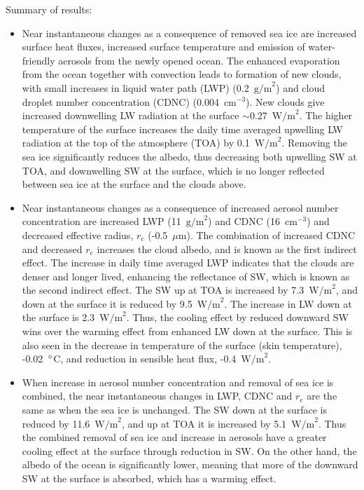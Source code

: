 Summary of results:
\begin{itemize}
\item Near instantaneous changes as a consequence of removed sea ice are increased surface heat fluxes, increased surface temperature and emission of water-friendly aerosols from the newly opened ocean. The enhanced evaporation from the ocean together with convection leads to formation of new clouds, with small increases in liquid water path (LWP) (0.2~$\text{g/m}^2$) and cloud droplet number concentration (CDNC) (0.004~$\text{cm}^{-3}$). New clouds give increased downwelling LW radiation at the surface $\sim$0.27~$\text{W/m}^2$. The higher temperature of the surface increases the daily time averaged upwelling LW radiation at the top of the atmosphere (TOA) by 0.1~$\text{W/m}^2$. Removing the sea ice significantly reduces the albedo, thus decreasing both upwelling SW at TOA, and downwelling SW at the surface, which is no longer reflected between sea ice at the surface and the clouds above.
\item Near instantaneous changes as a consequence of increased aerosol number concentration are increased LWP (11~$\text{g/m}^2$) and CDNC (16~$\text{cm}^{-3}$) and decreased effective radius, $r_e$ (-0.5~$\mu\text{m}$). The combination of increased CDNC and decreased $r_e$ increases the cloud albedo, and is known as the first indirect effect. The increase in daily time averaged LWP indicates that the clouds are denser and longer lived, enhancing the reflectance of SW, which is known as the second indirect effect. The SW up at TOA is increased by 7.3~$\text{W/m}^2$, and down at the surface it is reduced by 9.5~$\text{W/m}^2$. The increase in LW down at the surface is 2.3~$\text{W/m}^2$. Thus, the cooling effect by reduced downward SW wins over the warming effect from enhanced LW down at the surface. This is also seen in the decrease in temperature of the surface (skin temperature), -0.02~$\degree$C, and reduction in sensible heat flux, -0.4~$\text{W/m}^2$.
\item When increase in aerosol number concentration and removal of sea ice is combined, the near instantaneous changes in LWP, CDNC and $r_e$ are the same as when the sea ice is unchanged. The SW down at the surface is reduced by 11.6~$\text{W/m}^2$, and up at TOA it is increased by 5.1~$\text{W/m}^2$. Thus the combined removal of sea ice and increase in aerosols have a greater cooling effect at the surface through reduction in SW. On the other hand, the albedo of the ocean is significantly lower, meaning that more of the downward SW at the surface is absorbed, which has a warming effect.

\end{itemize}

